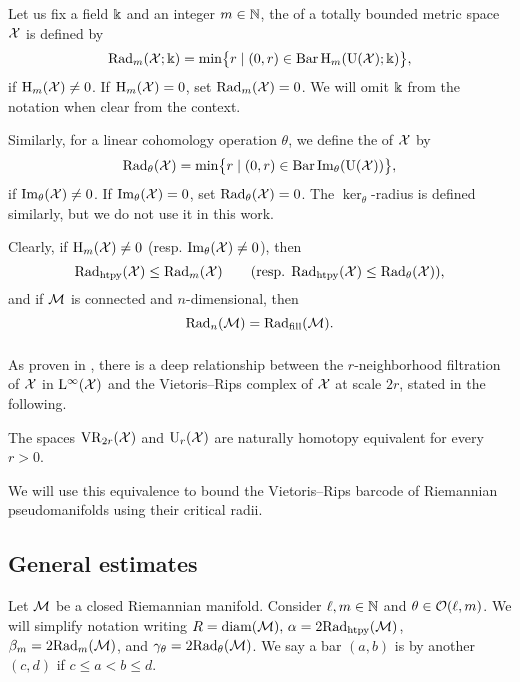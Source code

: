 \subsubsection{} \label{ss:beta v.s. fillrad}

Let us fix a field \(\field\) and an integer \(m \in \N\), the  of a totally bounded metric space \(\cX\) is defined by
\[
\firstdeath{m}{\cX; \field} = \min\set[\big]{r \mid (0, r) \in \barc \rH_m(\rU(\cX); \field)},
\]
if \(\rH_m(\cX) \neq 0\).
If \(\rH_m(\cX) = 0\), set \(\firstdeath{m}{\cX} = 0\).
We will omit \(\field\) from the notation when clear from the context.

Similarly, for a linear cohomology operation \(\theta\), we define the  of \(\cX\) by
\[
\firstdeath{\theta}{\cX} = \min\set[\big]{r \mid (0, r) \in \barc \img_\theta(\rU(\cX))},
\]
if \(\img_\theta(\cX) \neq 0\).
If \(\img_\theta(\cX) = 0\), set $\firstdeath{\theta}{\cX} = 0$.
The \(\ker_\theta\)-radius is defined similarly, but we do not use it in this work.

Clearly, if \(\rH_m(\cX) \neq 0\) (resp. \(\img_\theta(\cX) \neq 0\)), then
\[
\crit(\cX) \leq \firstdeath{m}{\cX} \qquad (\text{resp. }\crit(\cX) \leq  \firstdeath{\theta}{\cX}),
\]
and if $\cM$ is connected and $n$-dimensional, then
\[
\firstdeath{n}{\cM} = \fillrad(\cM).
\]

\subsubsection{}\label{ss:kuratowski_vr}

As proven in \cite[Thm.~4.1]{lim2024vietoris}, there is a deep relationship between the \(r\)-neighborhood filtration of $\cX$ in $\rL^\infty(\cX)$ and the Vietoris--Rips complex of \(\cX\) at scale \(2r\), stated in the following.

\proposition The spaces $\VR_{2r}(\cX)$ and $\rU_r(\cX)$ are naturally homotopy equivalent for every \(r > 0\).

\medskip We will use this equivalence to bound the Vietoris--Rips barcode of Riemannian pseudomanifolds using their critical radii.

\subsection{General estimates}\label{ss:barcode_general}

Let \(\cM\) be a closed Riemannian manifold.
Consider \(\ell, m \in \N\) and \(\theta \in \cO(\ell,m)\).
We will simplify notation writing \(R = \diam(\cM),\, \alpha = 2\crit(\cM)\), \(\beta_m = 2\firstdeath{m}{\cM}\), and \(\gamma_\theta = 2\firstdeath{\theta}{\cM}\).
We say a bar $(a, b)$ is  by another $(c,d)$ if $c \leq a < b \leq d$.

